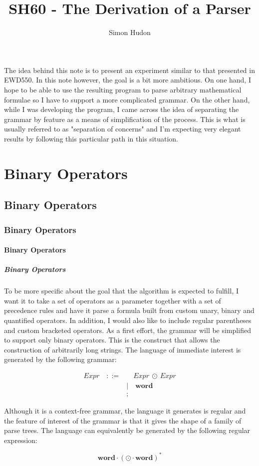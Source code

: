 \documentclass[10pt]{report}
\title{SH60 - The Derivation of a Parser}
\author{Simon Hudon}
\newcommand{\word}{\textbf{word}}
\newcounter{i}
\newcommand{\division}[2]{
	\setcounter{i}{1}
	\ifthenelse{#1 = \value{i}} {
		\section{#2}
	} {}
	\stepcounter{i}
	\ifthenelse{#1 = \value{i}} {
		\subsection{#2}
	} {}
	\stepcounter{i}
	\ifthenelse{#1 = \value{i}} {
		\subsubsection{#2}
	} {}
	\stepcounter{i}
	\ifthenelse{#1 = \value{i}} {
		\paragraph{#2}
	} {}
	\stepcounter{i}
	\ifthenelse{#1 = \value{i}} {
		\subparagraph{#2}
	} {}
	\stepcounter{i}
}
\begin{document}
\maketitle

The idea behind this note is to present an experiment similar to that presented in EWD550.  In this note however, the goal is a bit more ambitious.  On one hand, I hope to be able to use the resulting program to parse arbitrary mathematical formulae so I have to support a more complicated grammar.  On the other hand, while I was developing the program, I came across the idea of separating the grammar by feature as a means of simplification of the process.  This is what is usually referred to as "separation of concerns" and I'm expecting very elegant results by following this particular path in this situation.

\division{1}{Binary Operators}

To be more specific about the goal that the algorithm is expected to fulfill, I want it to take a set of operators as a parameter together with a set of precedence rules and have it parse a formula built from custom unary, binary and quantified operators.  In addition, I would also like to include regular parentheses and custom bracketed operators.  As a first effort, the grammar will be simplified to support only binary operators.  This is the construct that allows the construction of arbitrarily long strings.  The language of immediate interest is generated by the following grammar:

\begin{align}
	Expr \quad ::= & \quad Expr  \ \odot \ Expr  \label{csyntax} \\
		& | \quad \word \nonumber \\
		& \nonumber ;
\end{align}

Although it is a context-free grammar, the language it generates is regular and the feature of interest of the grammar is that it gives the shape of a family of parse trees.  The language can equivalently be generated by the following regular expression:

\[   \textbf{word} \cdot (\odot \cdot \textbf{word} ) ^ {*} \]
\end{document}
